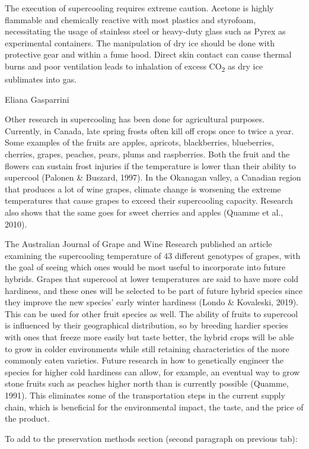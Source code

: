 The execution of supercooling requires extreme caution. Acetone is
highly flammable and chemically reactive with most plastics and
styrofoam, necessitating the usage of stainless steel or heavy-duty
glass such as Pyrex as experimental containers. The manipulation of dry
ice should be done with protective gear and within a fume hood. Direct
skin contact can cause thermal burns and poor ventilation leads to
inhalation of excess CO\textsubscript{2} as dry ice sublimates into gas.

Eliana Gasparrini

Other research in supercooling has been done for agricultural purposes.
Currently, in Canada, late spring frosts often kill off crops once to
twice a year. Some examples of the fruits are apples, apricots,
blackberries, blueberries, cherries, grapes, peaches, pears, plums and
raspberries. Both the fruit and the flowers can sustain frost injuries
if the temperature is lower than their ability to supercool (Palonen \&
Buszard, 1997). In the Okanagan valley, a Canadian region that produces
a lot of wine grapes, climate change is worsening the extreme
temperatures that cause grapes to exceed their supercooling capacity.
Research also shows that the same goes for sweet cherries and apples
(Quamme et al., 2010).

The Australian Journal of Grape and Wine Research published an article
examining the supercooling temperature of 43 different genotypes of
grapes, with the goal of seeing which ones would be most useful to
incorporate into future hybrids. Grapes that supercool at lower
temperatures are said to have more cold hardiness, and these ones will
be selected to be part of future hybrid species since they improve the
new species' early winter hardiness (Londo \& Kovaleski, 2019). This can
be used for other fruit species as well. The ability of fruits to
supercool is influenced by their geographical distribution, so by
breeding hardier species with ones that freeze more easily but taste
better, the hybrid crops will be able to grow in colder environments
while still retaining characteristics of the more commonly eaten
varieties. Future research in how to genetically engineer the species
for higher cold hardiness can allow, for example, an eventual way to
grow stone fruits such as peaches higher north than is currently
possible (Quamme, 1991). This eliminates some of the transportation
steps in the current supply chain, which is beneficial for the
environmental impact, the taste, and the price of the product.

To add to the preservation methods section (second paragraph on previous
tab):

